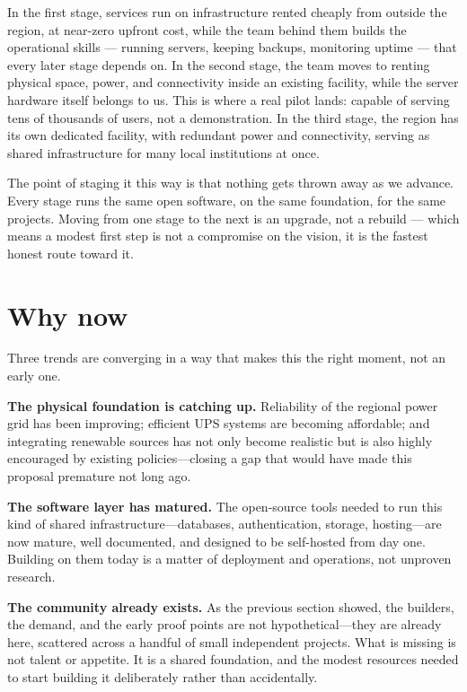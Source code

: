 \documentclass[12pt]{article}
\begin{document}
In the first stage, services run on infrastructure rented cheaply from outside
the region, at near-zero upfront cost, while the team behind them builds the
operational skills --- running servers, keeping backups, monitoring uptime ---
that every later stage depends on. In the second stage, the team moves to
renting physical space, power, and connectivity inside an existing facility,
while the server hardware itself belongs to us. This is where a real pilot
lands: capable of serving tens of thousands of users, not a demonstration. In
the third stage, the region has its own dedicated facility, with redundant power
and connectivity, serving as shared infrastructure for many local institutions
at once.

The point of staging it this way is that nothing gets thrown away as we advance.
Every stage runs the same open software, on the same foundation, for the same
projects. Moving from one stage to the next is an upgrade, not a rebuild --- which
means a modest first step is not a compromise on the vision, it is the fastest
honest route toward it.

\section{Why now}

Three trends are converging in a way that makes this the right moment, not an early one.

\textbf{The physical foundation is catching up.} Reliability of the regional power grid has been improving; efficient UPS systems are becoming affordable; and integrating renewable sources has not only become realistic but is also highly encouraged by existing policies—closing a gap that would have made this proposal premature not long ago.

\textbf{The software layer has matured.} The open-source tools needed to run this kind of shared infrastructure—databases, authentication, storage, hosting—are now mature, well documented, and designed to be self-hosted from day one. Building on them today is a matter of deployment and operations, not unproven research.

\textbf{The community already exists.} As the previous section showed, the builders, the demand, and the early proof points are not hypothetical—they are already here, scattered across a handful of small independent projects. What is missing is not talent or appetite. It is a shared foundation, and the modest resources needed to start building it deliberately rather than accidentally.
\end{document}
